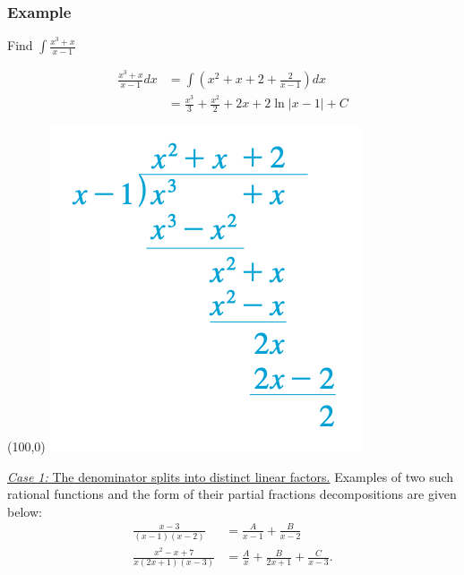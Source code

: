 \documentclass[t]{beamer}
\theoremstyle{plain}
\theoremstyle{definition}
\begin{document}
\begin{frame}
\frametitle{Example}

Find $\displaystyle\int\frac{x^3 + x}{x - 1}$ \pause

\begin{align*}
\displaystyle\frac{x^3 + x}{x - 1}dx &= \int\left(x^2 + x + 2 + \frac{2}{x-1}\right)dx\\
&= \frac{x^3}{3} + \frac{x^2}{2} + 2x + 2 \ln |x - 1| + C
\end{align*}

\begin{textblock}{0.3}(100,0)
      \includegraphics[scale=0.45]{fig/divide}
\end{textblock}

\end{frame}

\begin{frame}
\noindent\underline{\textit{Case 1:} The denominator splits into distinct linear factors.}
Examples of two such rational functions and the form of their partial fractions decompositions are given below:
\begin{align*}
\frac{x-3}{(x-1)(x-2)}&= {\frac{A}{x-1}+\frac{B}{x-2}}\\
\frac{x^2-x+7}{x(2x+1)(x-3)}&= {\frac{A}{x}+\frac{B}{2x+1}+\frac{C}{x-3}}.
\end{align*}

\end{frame}
\end{document}

